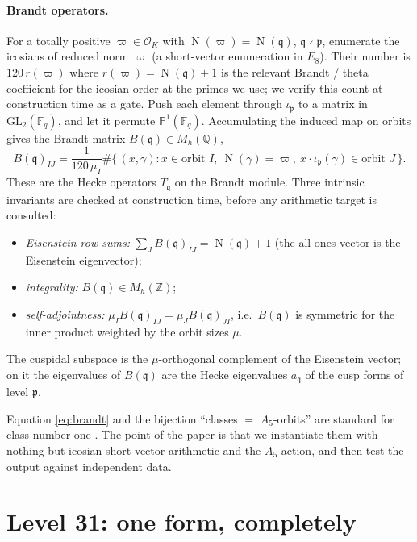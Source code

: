 \documentclass[11pt,a4paper]{article}
\newcommand{\Q}{\mathbb{Q}}
\newcommand{\Z}{\mathbb{Z}}
\newcommand{\F}{\mathbb{F}}
\newcommand{\PP}{\mathbb{P}}
\newcommand{\Ord}{\mathcal{O}}
\newcommand{\fp}{\mathfrak{p}}
\newcommand{\fq}{\mathfrak{q}}
\newcommand{\Brandt}{B}
\newcommand{\OK}{\Ord_K}
\DeclareMathOperator{\Nm}{N}
\begin{document}
\paragraph{Brandt operators.}
For a totally positive $\varpi\in\OK$ with $\Nm(\varpi)=\Nm(\fq)$,
$\fq\nmid\fp$, enumerate the icosians of reduced norm $\varpi$ (a
short-vector enumeration in $E_8$). Their number is
$120\,r(\varpi)$ where $r(\varpi)=\Nm(\fq)+1$ is the relevant Brandt /
theta coefficient for the icosian order at the primes we use; we verify
this count at construction time as a gate. Push each element through
$\iota_\fp$ to a matrix in $\mathrm{GL}_2(\F_q)$, and let it permute
$\PP^1(\F_q)$. Accumulating the induced map on orbits gives the Brandt
matrix $\Brandt(\fq)\in M_h(\Q)$,
\begin{equation}
  \Brandt(\fq)_{IJ}=\frac{1}{120\,\mu_I}
  \#\{\,(x,\gamma): x\in\text{orbit }I,\ \Nm(\gamma)=\varpi,\
  x\cdot\iota_\fp(\gamma)\in\text{orbit }J\,\}.
  \label{eq:brandt}
\end{equation}
These are the Hecke operators $T_\fq$ on the Brandt module. Three
intrinsic invariants are checked at construction time, before any
arithmetic target is consulted:
\begin{itemize}[leftmargin=1.5em]
\item \emph{Eisenstein row sums:} $\sum_J\Brandt(\fq)_{IJ}=\Nm(\fq)+1$
(the all-ones vector is the Eisenstein eigenvector);
\item \emph{integrality:} $\Brandt(\fq)\in M_h(\Z)$;
\item \emph{self-adjointness:} $\mu_I\Brandt(\fq)_{IJ}=
\mu_J\Brandt(\fq)_{JI}$, i.e.\ $\Brandt(\fq)$ is symmetric for the inner
product weighted by the orbit sizes $\mu$.
\end{itemize}
The cuspidal subspace is the $\mu$-orthogonal complement of the
Eisenstein vector; on it the eigenvalues of $\Brandt(\fq)$ are the
Hecke eigenvalues $a_\fq$ of the cusp forms of level $\fp$.

\begin{scopebox}
Equation \eqref{eq:brandt} and the bijection ``classes $=$ $A_5$-orbits''
are standard for class number one \cite{Vigneras1980,Voight2021}. The
point of the paper is that we instantiate them with nothing but icosian
short-vector arithmetic and the $A_5$-action, and then test the output
against independent data.
\end{scopebox}

\section{Level 31: one form, completely}\label{sec:level31}
\end{document}
